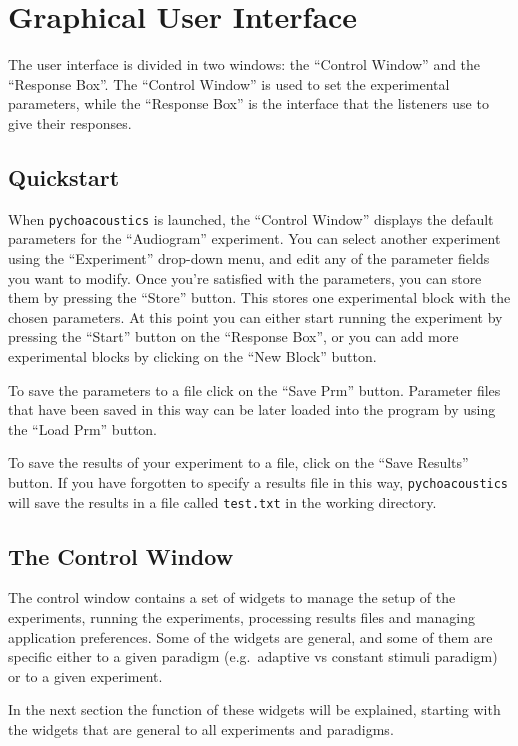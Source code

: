 \chapter{Graphical User Interface}

The user interface is divided in two windows: the ``Control Window'' and the ``Response Box''. The ``Control Window'' 
is used to set the experimental parameters, while the ``Response Box'' 
is the interface that the listeners use to give their responses.

\section{Quickstart}
When \texttt{pychoacoustics} is launched, the ``Control Window'' displays the default parameters for 
the ``Audiogram'' experiment. You can select another experiment using the ``Experiment'' 
drop-down menu, and edit any of the parameter fields you want to modify. Once you're 
satisfied with the parameters, you can store them by pressing the ``Store'' button. 
This stores one experimental block with the chosen parameters. At this point you 
can either start running the experiment by pressing the ``Start'' button on the 
``Response Box'', or you can add more experimental blocks by clicking on the ``New Block'' button.

To save the parameters to a file click on the ``Save Prm'' button. 
Parameter files that have been saved in this way can be later loaded 
into the program by using the ``Load Prm'' button.

To save the results of your experiment to a file, click on the ``Save Results'' button. 
If you have forgotten to specify a results file in this way, \texttt{pychoacoustics} 
will save the results in a file called \texttt{test.txt} in the working directory. 

\section{The Control Window}
The control window contains a set of widgets to manage the setup of the experiments,
running the experiments, processing results files and managing application preferences. 
Some of the widgets are general, and some of them are specific either to a given
paradigm (e.g.\ adaptive vs constant stimuli paradigm) or to a given experiment.

In the next section the function of these widgets will be explained, starting with the
widgets that are general to all experiments and paradigms.

